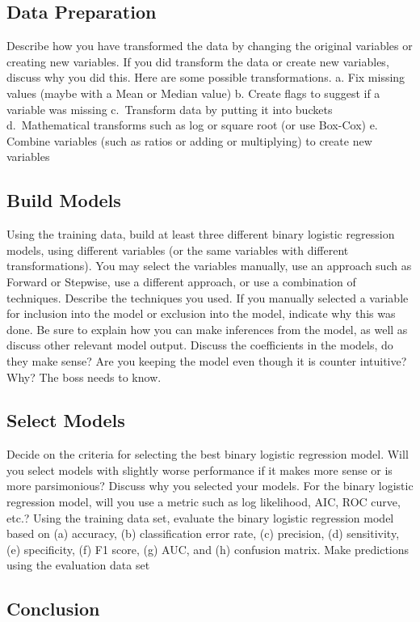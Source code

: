 \documentclass[
]{article}
\begin{document}
\hypertarget{data-preparation}{%
\subsection{Data Preparation}\label{data-preparation}}

Describe how you have transformed the data by changing the original
variables or creating new variables. If you did transform the data or
create new variables, discuss why you did this. Here are some possible
transformations. a. Fix missing values (maybe with a Mean or Median
value) b. Create flags to suggest if a variable was missing c.~Transform
data by putting it into buckets d.~Mathematical transforms such as log
or square root (or use Box-Cox) e. Combine variables (such as ratios or
adding or multiplying) to create new variables

\hypertarget{build-models}{%
\subsection{Build Models}\label{build-models}}

Using the training data, build at least three different binary logistic
regression models, using different variables (or the same variables with
different transformations). You may select the variables manually, use
an approach such as Forward or Stepwise, use a different approach, or
use a combination of techniques. Describe the techniques you used. If
you manually selected a variable for inclusion into the model or
exclusion into the model, indicate why this was done. Be sure to explain
how you can make inferences from the model, as well as discuss other
relevant model output. Discuss the coefficients in the models, do they
make sense? Are you keeping the model even though it is counter
intuitive? Why? The boss needs to know.

\hypertarget{select-models}{%
\subsection{Select Models}\label{select-models}}

Decide on the criteria for selecting the best binary logistic regression
model. Will you select models with slightly worse performance if it
makes more sense or is more parsimonious? Discuss why you selected your
models. For the binary logistic regression model, will you use a metric
such as log likelihood, AIC, ROC curve, etc.? Using the training data
set, evaluate the binary logistic regression model based on (a)
accuracy, (b) classification error rate, (c) precision, (d) sensitivity,
(e) specificity, (f) F1 score, (g) AUC, and (h) confusion matrix. Make
predictions using the evaluation data set

\hypertarget{conclusion}{%
\subsection{Conclusion}\label{conclusion}}
\end{document}
